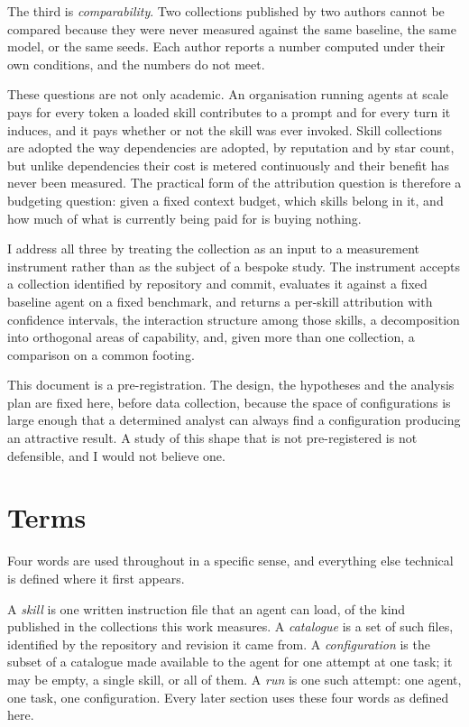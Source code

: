 \documentclass[11pt]{article}
\theoremstyle{plain}
\theoremstyle{definition}
\theoremstyle{remark}
\begin{document}
The third is \emph{comparability}. Two collections published by two authors cannot be compared because they were never measured against the same baseline, the same model, or the same seeds. Each author reports a number computed under their own conditions, and the numbers do not meet.

These questions are not only academic. An organisation running agents at scale pays for every token a loaded skill contributes to a prompt and for every turn it induces, and it pays whether or not the skill was ever invoked. Skill collections are adopted the way dependencies are adopted, by reputation and by star count, but unlike dependencies their cost is metered continuously and their benefit has never been measured. The practical form of the attribution question is therefore a budgeting question: given a fixed context budget, which skills belong in it, and how much of what is currently being paid for is buying nothing.

I address all three by treating the collection as an input to a measurement instrument rather than as the subject of a bespoke study. The instrument accepts a collection identified by repository and commit, evaluates it against a fixed baseline agent on a fixed benchmark, and returns a per-skill attribution with confidence intervals, the interaction structure among those skills, a decomposition into orthogonal areas of capability, and, given more than one collection, a comparison on a common footing.

This document is a pre-registration. The design, the hypotheses and the analysis plan are fixed here, before data collection, because the space of configurations is large enough that a determined analyst can always find a configuration producing an attractive result. A study of this shape that is not pre-registered is not defensible, and I would not believe one.

\section{Terms}
\label{sec:terms}

Four words are used throughout in a specific sense, and everything else technical is defined where it first appears.

A \emph{skill} is one written instruction file that an agent can load, of the kind published in the collections this work measures. A \emph{catalogue} is a set of such files, identified by the repository and revision it came from. A \emph{configuration} is the subset of a catalogue made available to the agent for one attempt at one task; it may be empty, a single skill, or all of them. A \emph{run} is one such attempt: one agent, one task, one configuration. Every later section uses these four words as defined here.
\end{document}
